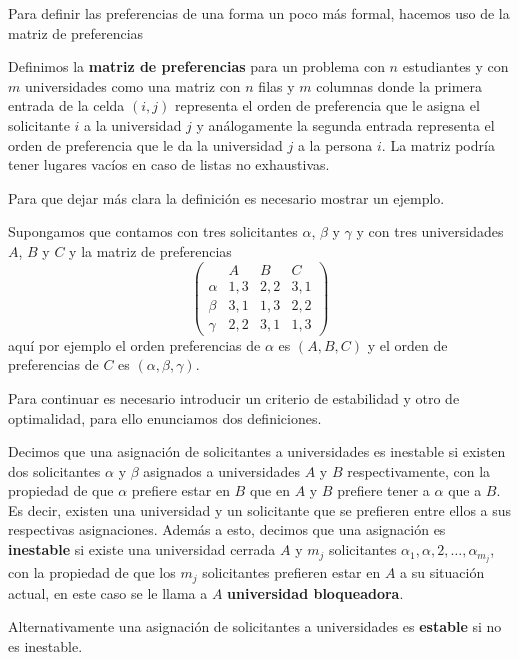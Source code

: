 Para definir las preferencias de una forma un poco más formal, hacemos uso de la matriz de preferencias

\begin{dfn}
\label{matpref}
Definimos la \textbf{matriz de preferencias} para un problema con $n$ estudiantes y con $m$ universidades como una matriz con $n$ filas y $m$ columnas donde la primera entrada de la celda $(i,j)$ representa el orden de preferencia que le asigna el solicitante $i$ a la universidad $j$ y análogamente la segunda entrada representa el orden de preferencia que le da la universidad $j$ a la persona $i$. La matriz podría tener lugares vacíos en caso de listas no exhaustivas. 
\end{dfn}

Para que dejar más clara la definición es necesario mostrar un ejemplo. 

\begin{eje}
\label{ejemplo matrimonio 1}
Supongamos que contamos con tres solicitantes $\alpha$, $\beta$ y $\gamma$ y con tres universidades $A$, $B$ y $C$ y la matriz de preferencias
$$\begin{pmatrix}
& A & B & C \\
\alpha & 1,3 & 2,2 & 3,1 \\
\beta & 3,1 & 1,3 & 2,2 \\
\gamma & 2,2 & 3,1 & 1,3 
\end{pmatrix}$$
aquí por ejemplo el orden preferencias de $\alpha$ es $(A,B,C)$ y el orden de preferencias de $C$ es $(\alpha, \beta, \gamma)$.
\fin
\end{eje}


Para continuar es necesario introducir un criterio de estabilidad y otro de optimalidad, para ello enunciamos dos definiciones. 

\begin{dfn}{\cite{GaleShapley}}
\label{Estable}
Decimos que una asignación de solicitantes a universidades es inestable si existen dos solicitantes $\alpha$ y $\beta$ asignados a universidades $A$ y $B$ respectivamente, con la propiedad de que $\alpha$ prefiere estar en $B$ que en $A$ y $B$ prefiere tener a $\alpha$ que a $B$. Es decir, existen una universidad y un solicitante que se prefieren entre ellos a sus respectivas asignaciones. 
Además a esto, decimos que una asignación es \textbf{inestable} si existe una universidad cerrada $A$ y $m_j$ solicitantes $\alpha_1,\alpha,2,\dots,\alpha_{m_j}$, con la propiedad de que los $m_j$ solicitantes prefieren estar en $A$ a su situación actual, en este caso se le llama a $A$ \textbf{universidad bloqueadora}.

Alternativamente una asignación de solicitantes a universidades es \textbf{estable} si no es inestable.
\end{dfn}

